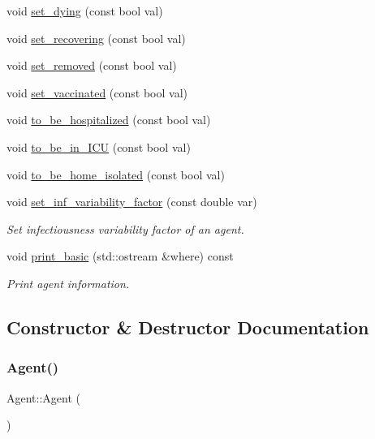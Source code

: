 \begin{DoxyCompactItemize}
void \hyperlink{classAgent_a0aebc28223173d54cf285de7705e6ff9}{set\+\_\+dying} (const bool val)
\item 
void \hyperlink{classAgent_a30f78d00b5e77545919f1045de389cc0}{set\+\_\+recovering} (const bool val)
\item 
void \hyperlink{classAgent_a9f817ef4dd7715e59da98956acb9803a}{set\+\_\+removed} (const bool val)
\item 
void \hyperlink{classAgent_adcdd68040573001d599a3163cafb6f3f}{set\+\_\+vaccinated} (const bool val)
\item 
void \hyperlink{classAgent_a5075fdcc53362b63931c5f8dd1e40a89}{to\+\_\+be\+\_\+hospitalized} (const bool val)
\item 
void \hyperlink{classAgent_a82cf089cd4bd5686670a5bd44be24a02}{to\+\_\+be\+\_\+in\+\_\+\+I\+CU} (const bool val)
\item 
void \hyperlink{classAgent_a875ad6702903a0ed7c8a7348a08b2f14}{to\+\_\+be\+\_\+home\+\_\+isolated} (const bool val)
\item 
void \hyperlink{classAgent_a8903c8e72857920e75be99f103b90ee5}{set\+\_\+inf\+\_\+variability\+\_\+factor} (const double var)
\begin{DoxyCompactList}\small\item\em Set infectiousness variability factor of an agent. \end{DoxyCompactList}\item 
void \hyperlink{classAgent_a2ea370bc4e0ea8338e95f3548c593c1f}{print\+\_\+basic} (std\+::ostream \&where) const
\begin{DoxyCompactList}\small\item\em Print agent information. \end{DoxyCompactList}\end{DoxyCompactItemize}


\subsection{Constructor \& Destructor Documentation}
\mbox{\label{classAgent_adbc1a27ec2c086160d3c28622ea02f3b}} 
\subsubsection{\texorpdfstring{Agent()}{Agent()}\hspace{0.1cm}{\footnotesize\ttfamily [1/2]}}
{\footnotesize\ttfamily Agent\+::\+Agent (\begin{DoxyParamCaption}{ }\end{DoxyParamCaption})\hspace{0.3cm}{\ttfamily [default]}}



